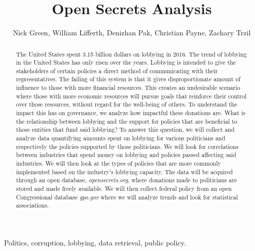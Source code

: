 \documentclass[journal]{IEEEtran}
\begin{document}
\title{Open Secrets Analysis}

\author{Nick Green, William Lifferth, Denizhan Pak, Christian Payne, Zachary Trzil} \maketitle


\begin{abstract}
  The United States spent 3.15 billion dollars on lobbying in 2016. The trend of lobbying in the United States has only risen over the years. Lobbying is intended to give the stakeholders of certain policies a direct method of communicating with their representatives. The failing of this system is that it gives disproportionate amount of influence to those with more financial resources. This creates an undesirable scenario where those with more economic resources will pursue goals that reinforce their control over those resources, without regard for the well-being of others. To understand the impact this has on governance, we analyze how impactful these donations are. What is the relationship between lobbying and the support for policies that are beneficial to those entities that fund said lobbying? To answer this question, we will collect and analyze data quantifying amounts spent on lobbying for various politicians and respectively the policies supported by those politicians. We will look for correlations between industries that spend money on lobbying and policies passed affecting said industries. We will then look at the types of policies that are more commonly implemented based on the industry's lobbying capacity. The data will be acquired through an open database, \textit{opensecrets.org}, where donations made to politicians are stored and made freely available. We will then collect federal policy from an open Congressional database \textit{gpo.gov} where we will analyze trends and look for statistical associations.
\end{abstract}

\begin{IEEEkeywords}
Politics, corruption, lobbying, data retrieval, public policy.
\end{IEEEkeywords}
\end{document}
